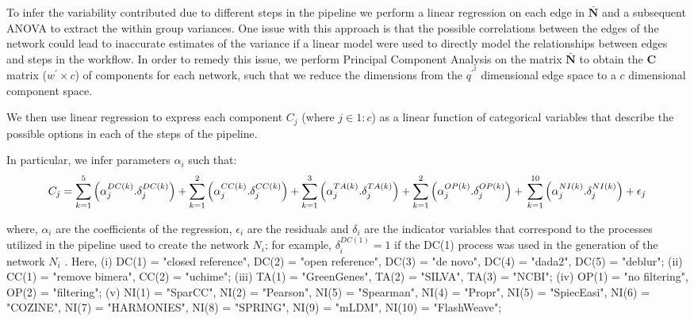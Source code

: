   To infer the variability contributed due to different steps in the pipeline we perform a linear regression on each edge in $\mathbf{\bar{N}}$ and a subsequent ANOVA to extract the within group variances.
  One issue with this approach is that the possible correlations between the edges of the network could lead to inaccurate estimates of the variance if a linear model were used to directly model the relationships between edges and steps in the workflow.
  In order to remedy this issue, we perform Principal Component Analysis on the matrix $\mathbf{\bar{N}}$ to obtain the $\mathbf{C}$ matrix ($w^\prime \times c$) of components for each network, such that we reduce the dimensions from the $q^\prime^2$ dimensional edge space to a $c$ dimensional component space.

  We then use linear regression to express each component $C_j$ (where $j \in 1:c$) as a linear function of categorical variables that describe the possible options in each of the steps of the pipeline.

  In particular, we infer parameters $\alpha_i$ such that:
   \begin{equation*}
       C_j = \sum_{k=1}^5 \left( \alpha^{DC(k)}_j.\delta^{DC(k)}_j \right) +
             \sum_{k=1}^2 \left( \alpha^{CC(k)}_j.\delta^{CC(k)}_j \right) +
             \sum_{k=1}^3 \left( \alpha^{TA(k)}_j.\delta^{TA(k)}_j \right) +
             \sum_{k=1}^2 \left( \alpha^{OP(k)}_j.\delta^{OP(k)}_j \right) + \\
             \sum_{k=1}^{10} \left( \alpha^{NI(k)}_j.\delta^{NI(k)}_j \right) +
             \epsilon_j
   \end{equation*}

   where, $\alpha_i$ are the coefficients of the regression, $\epsilon_i$ are the residuals and $\delta_i$ are the indicator variables that correspond to the processes utilized in the pipeline used to create the network $N_i$; for example, $\delta^{DC(1)}_i = 1$ if the DC(1) process was used in the generation of the network $N_i$ .
   Here, (i) DC(1) = "closed reference", DC(2) = "open reference", DC(3) = "de novo", DC(4) = "dada2", DC(5) = "deblur";
   (ii) CC(1) = "remove bimera", CC(2) = "uchime";
   (iii)  TA(1) = "GreenGenes", TA(2) = "SILVA", TA(3) = "NCBI";
   (iv) OP(1) = "no filtering", OP(2) = "filtering";
   (v) NI(1) = "SparCC", NI(2) = "Pearson", NI(5) = "Spearman", NI(4) = "Propr", NI(5) = "SpiecEasi", NI(6) = "COZINE", NI(7) = "HARMONIES", NI(8) = "SPRING", NI(9) = "mLDM", NI(10) = "FlashWeave";

